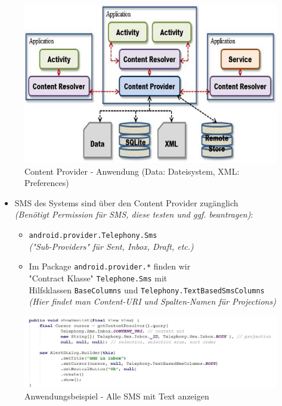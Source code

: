 \documentclass[a4paper]{article}
\begin{document}
\begin{figure}[htb!]
	\centering
	\includegraphics[width=.7\textwidth]{img/contentprovider.jpg}
	\caption{Content Provider - Anwendung (Data: Dateisystem, XML: Preferences)}
\end{figure}

\newpage

\begin{itemize}
	\item SMS des Systems sind über den Content Provider zugänglich\\
	\textit{(Benötigt Permission für SMS, diese testen und ggf. beantragen)}:
		\begin{itemize}
			\item \texttt{android.provider.Telephony.Sms}\\
			\textit{("Sub-Providers" für Sent, Inbox, Draft, etc.)}
			\item Im Package \texttt{android.provider.*} finden wir \\
			"Contract Klasse" \texttt{Telephone.Sms} mit \\
			Hilfsklassen \texttt{BaseColumns} und \texttt{Telephony.TextBasedSmsColumns}\\
			\textit{(Hier findet man Content-URI und Spalten-Namen für Projections)}
		\end{itemize}
\end{itemize}

\begin{figure}[htb!]
	\centering
	\includegraphics[width=\textwidth]{img/content_sms.jpg}
	\caption{Anwendungsbeispiel - Alle SMS mit Text anzeigen}
\end{figure}
\end{document}
